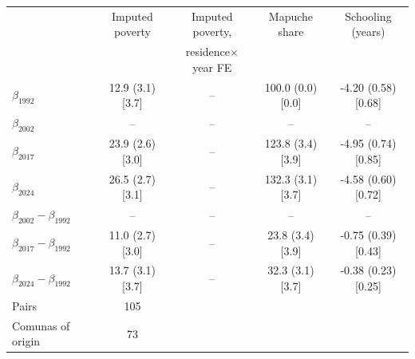 \begin{tabular}{lcccc}
\toprule
 & Imputed poverty & Imputed poverty, & Mapuche share & Schooling (years) \\
 & & residence$\times$year FE & & \\
\midrule
$\beta_{1992}$ & 12.9 (3.1) [3.7] & -- & 100.0 (0.0) [0.0] & -4.20 (0.58) [0.68] \\
$\beta_{2002}$ & -- & -- & -- & -- \\
$\beta_{2017}$ & 23.9 (2.6) [3.0] & -- & 123.8 (3.4) [3.9] & -4.95 (0.74) [0.85] \\
$\beta_{2024}$ & 26.5 (2.7) [3.1] & -- & 132.3 (3.1) [3.7] & -4.58 (0.60) [0.72] \\
\midrule
$\beta_{2002}-\beta_{1992}$ & -- & -- & -- & -- \\
$\beta_{2017}-\beta_{1992}$ & 11.0 (2.7) [3.0] & -- & 23.8 (3.4) [3.9] & -0.75 (0.39) [0.43] \\
$\beta_{2024}-\beta_{1992}$ & 13.7 (3.1) [3.7] & -- & 32.3 (3.1) [3.7] & -0.38 (0.23) [0.25] \\
\midrule
Pairs & 105 & & & \\
Comunas of origin & 73 & & & \\
\bottomrule
\end{tabular}
